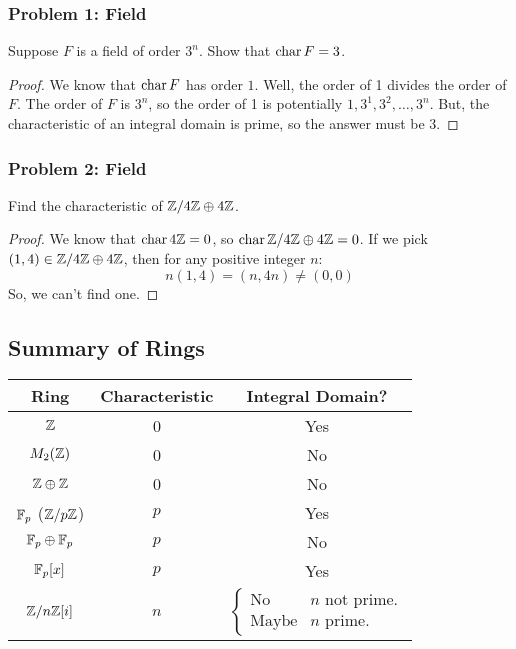 \documentclass[letterpaper]{article}
\begin{document}
\subsubsection{Problem 1: Field}
Suppose $F$ is a field of order $3^n$. Show that $\operatorname{char}{F} = 3$. 

\begin{mdframed}[]
    \begin{proof}
        We know that $\operatorname{char}{F}$ has order $1$. Well, the order of 1 divides the order of $F$. The order of $F$ is $3^n$, so the order of 1 is potentially $1, 3^1, 3^2, \dots, 3^n$. But, the characteristic of an integral domain is prime, so the answer must be 3. 
    \end{proof}
\end{mdframed}

\subsubsection{Problem 2: Field}
Find the characteristic of $\mathbb{Z} / 4\mathbb{Z} \oplus 4\mathbb{Z}$. 

\begin{mdframed}[]
    \begin{proof}
        We know that $\operatorname{char}{4\mathbb{Z}} = 0$, so $\operatorname{char}{\mathbb{Z} / 4\mathbb{Z} \oplus 4\mathbb{Z}} = 0$. If we pick $(1, 4) \in \mathbb{Z} / 4\mathbb{Z} \oplus 4\mathbb{Z}$, then for any positive integer $n$:
        \[n(1, 4) = (n, 4n) \neq (0, 0)\]
        So, we can't find one.
    \end{proof}
\end{mdframed}

\subsection{Summary of Rings}
\begin{center}
    \begin{tabular}{c|c|c}
        \textbf{Ring}   & \textbf{Characteristic} & \textbf{Integral Domain?} \\ 
        \hline 
        $\mathbb{Z}$            & 0                       & Yes \\ 
        $M_{2}(\mathbb{Z})$     & 0                       & No \\ 
        $\mathbb{Z} \oplus \mathbb{Z}$  & 0                       & No \\ 
        $\mathbb{F}_p$ ($\mathbb{Z} / p\mathbb{Z}$) & $p$                 & Yes \\ 
        $\mathbb{F}_p \oplus \mathbb{F}_p$ & $p$                  & No \\ 
        $\mathbb{F}_{p}[x]$     & $p$                     & Yes \\ 
        $\mathbb{Z} / n\mathbb{Z}[i]$   & $n$                     & $\begin{cases}
            \text{No} & n \text{ not prime.} \\ 
            \text{Maybe} & n \text{ prime.}
        \end{cases}$
    \end{tabular}
\end{center}
\end{document}
